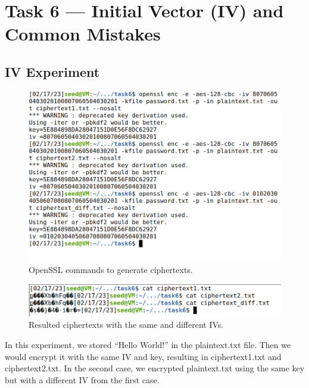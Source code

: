 \section{Task 6 --- Initial Vector (IV) and Common Mistakes}
%
\subsection{IV Experiment}
%

\begin{figure}
    \centering
    \includegraphics[height=\textheight,width=\textwidth,keepaspectratio]
    {figures/generate_cipher_dif_IV.png}
    \caption{OpenSSL commands to generate ciphertexts.}\label{fig:diff_IV_script}
\end{figure}

\begin{figure}
    \centering
    \includegraphics[height=\textheight,width=\textwidth,keepaspectratio]
    {figures/result_diff_IV.png}
    \caption{Resulted ciphertexts with the same and different IVs.}\label{fig:ciphertext_IV}
\end{figure}

In this experiment, we stored ``Hello World!'' in the {\selectfont plaintext.txt}
file. Then we would encrypt it with the same IV and key, resulting in {\selectfont
ciphertext1.txt} and {\selectfont ciphertext2.txt}. In the second case, we
encrypted {\selectfont plaintext.txt} using the same key but with a different
IV from the first case.

